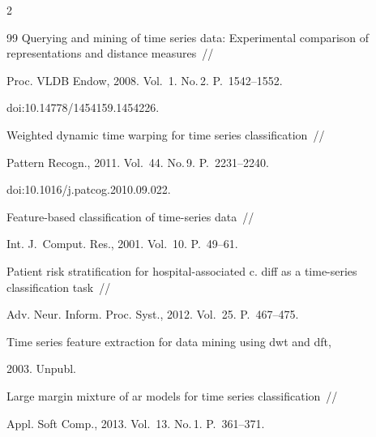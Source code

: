 \begin{multicols}{2}
{{\begin{thebibliography}{99}
Querying and mining of time series data: Experimental comparison of representations and distance measures~//


{Proc. VLDB Endow}, 2008. Vol.~1. No.\,2. P.~1542--1552.


 doi:10.14778/1454159.1454226.









Weighted dynamic time warping for time series classification~//


{Pattern Recogn.}, 2011. Vol.~44. No.\,9. P.~2231--2240.


doi:10.1016/j.patcog.2010.09.022.









Feature-based classification of time-series data~//


{Int. J.~Comput. Res.}, 2001. Vol.~10. P.~49--61.









Patient risk stratification for hospital-associated c. diff as a time-series classification task~//


{Adv. Neur. Inform. Proc. Syst.}, 2012. Vol.~25. P.~467--475.









 Time series feature extraction for data mining using dwt and dft,


 2003. Unpubl.









 Large margin mixture of ar models for time series classification~//


{Appl. Soft Comp.}, 2013. Vol.~13. No.\,1. P.~361--371.






\end{thebibliography}}}
\end{multicols}
